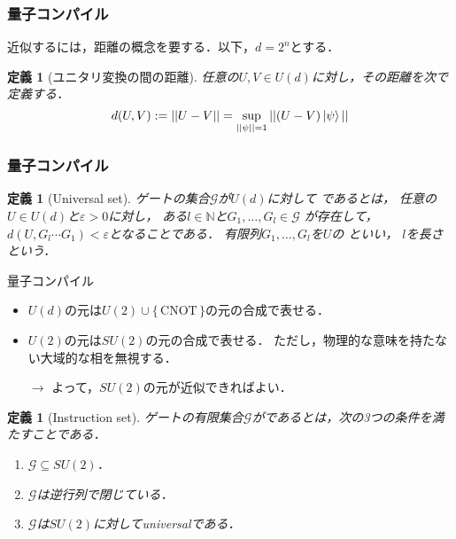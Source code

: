 \documentclass{beamer} %
\newcommand{\N}{\mathbb{N}}%
\renewcommand{\epsilon}{\varepsilon}
\renewcommand{\subset}{\subseteq}
\newcommand{\set}[1]{\{\,#1\,\}}%
\newtheorem{dfn}[thm]{定義}
\newcommand{\0}{\mathbf{0}}
\newcommand{\1}{\mathbf{1}}
\newcommand{\2}{\mathbf{2}}
\newcommand{\CNOT}{\mathrm{CNOT}}
\begin{document}
\begin{frame}
  \frametitle{量子コンパイル}
  近似するには，距離の概念を要する．以下，\(d=2^n\)とする．
  \begin{dfn}[ユニタリ変換の間の距離]
    任意の\(U,V\in U(d)\)に対し，その距離を次で定義する．
    \[
      d(U,V):=||U-V||=\sup_{||\psi||=1}||(U-V)\ket{\psi}||
    \]
  \end{dfn}
\end{frame}

\begin{frame}
  \frametitle{量子コンパイル}
  \begin{dfn}[Universal set]
    ゲートの集合\(\mathcal{G}\)が\(U(d)\)に対して
    であるとは，
    任意の\(U\in U(d)\)と\(\epsilon >0\)に対し，
    ある\(l\in\N\)と\(G_1,\ldots,G_l\in\mathcal{G}\)
    が存在して，\(d(U,G_l\cdots G_1)<\epsilon\)となることである．
    有限列\(G_1,\ldots,G_l\)を\(U\)の
    \structure{\(\epsilon\)近似列}といい，
    \(l\)を長さという．
  \end{dfn}

\end{frame}


\begin{frame}{量子コンパイル}
  \begin{itemize}
    \item \(U(d)\)の元は\(U(2)\cup\set{\CNOT}\)の元の合成で表せる．
    \item \(U(2)\)の元は\(SU(2)\)の元の合成で表せる．
          ただし，物理的な意味を持たない大域的な相を無視する．
          \begin{center}
            \(\longrightarrow\)
            よって，\(SU(2)\)の元が近似できればよい．
          \end{center}
  \end{itemize}
  \begin{dfn}[Instruction set]
    ゲートの有限集合\(\mathcal{G}\)がであるとは，次の3つの条件を満たすことである．
    \begin{enumerate}
      \item \(\mathcal{G} \subset SU(2)\)．
      \item \(\mathcal{G}\)は逆行列で閉じている．
      \item \(\mathcal{G}\)は\(SU(2)\)に対してuniversalである．
    \end{enumerate}
  \end{dfn}
\end{frame}
\end{document}
